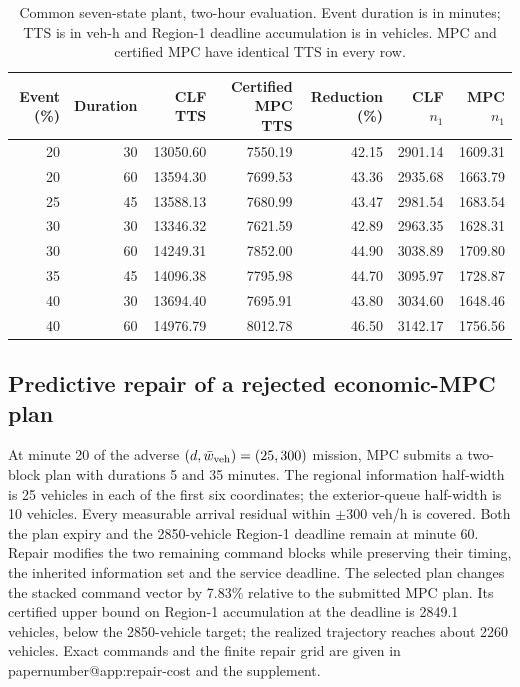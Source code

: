 \documentclass[preprint,12pt]{elsarticle}
\makeatletter
\numberwithin{equation}{section}
\newcommand{\papernumber}[1]{\csname papernumber@#1\endcsname}
\makeatother
\begin{document}
\begin{table}[t]
\centering\footnotesize
\caption{Common seven-state plant, two-hour evaluation. Event duration is
in minutes; TTS is in veh-h and Region-1 deadline accumulation is in vehicles.
MPC and certified MPC have identical TTS in every row.}
\label{tab:clf-common}
\setlength{\tabcolsep}{3pt}
\begin{tabular}{@{}rr rrr rr@{}}
\toprule
Event (\%) & Duration & CLF TTS & Certified MPC TTS & Reduction (\%) & CLF $n_1$ & MPC $n_1$\\
\midrule
20 & 30 & 13050.60 & 7550.19 & 42.15 & 2901.14 & 1609.31\\
20 & 60 & 13594.30 & 7699.53 & 43.36 & 2935.68 & 1663.79\\
25 & 45 & 13588.13 & 7680.99 & 43.47 & 2981.54 & 1683.54\\
30 & 30 & 13346.32 & 7621.59 & 42.89 & 2963.35 & 1628.31\\
30 & 60 & 14249.31 & 7852.00 & 44.90 & 3038.89 & 1709.80\\
35 & 45 & 14096.38 & 7795.98 & 44.70 & 3095.97 & 1728.87\\
40 & 30 & 13694.40 & 7695.91 & 43.80 & 3034.60 & 1648.46\\
40 & 60 & 14976.79 & 8012.78 & 46.50 & 3142.17 & 1756.56\\
\bottomrule
\end{tabular}
\end{table}

\subsection{Predictive repair of a rejected economic-MPC plan}


At minute 20 of the adverse $(d,\bar w_{\rm veh})=(25,300)$ mission, MPC
submits a two-block plan with durations 5 and 35 minutes. The regional
information half-width is 25 vehicles in each of the first six coordinates;
the exterior-queue half-width is 10 vehicles. Every measurable arrival
residual within $\pm300$ veh/h is covered. Both the plan expiry and the
2850-vehicle Region-1 deadline remain at minute 60. Repair modifies the two remaining command blocks while preserving
their timing, the inherited information set and the service deadline.
The selected plan changes the stacked command vector by 7.83\%
relative to the submitted MPC plan. Its certified upper bound on
Region-1 accumulation at the deadline is 2849.1 vehicles, below
the 2850-vehicle target; the realized trajectory reaches about 2260
vehicles. Exact commands and the finite repair grid are given
in \papernumber{app:repair-cost} and the supplement.
\end{document}
